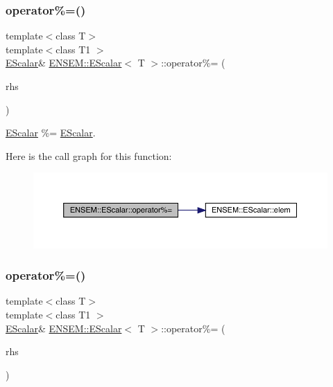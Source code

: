 \subsubsection{\texorpdfstring{operator\%=()}{operator\%=()}\hspace{0.1cm}{\footnotesize\ttfamily [1/3]}}
{\footnotesize\ttfamily template$<$class T$>$ \\
template$<$class T1 $>$ \\
\mbox{\hyperlink{classENSEM_1_1EScalar}{E\+Scalar}}\& \mbox{\hyperlink{classENSEM_1_1EScalar}{E\+N\+S\+E\+M\+::\+E\+Scalar}}$<$ T $>$\+::operator\%= (\begin{DoxyParamCaption}\item[{const \mbox{\hyperlink{classENSEM_1_1EScalar}{E\+Scalar}}$<$ T1 $>$ \&}]{rhs }\end{DoxyParamCaption})\hspace{0.3cm}{\ttfamily [inline]}}



\mbox{\hyperlink{classENSEM_1_1EScalar}{E\+Scalar}} \%= \mbox{\hyperlink{classENSEM_1_1EScalar}{E\+Scalar}}. 

Here is the call graph for this function\+:
\nopagebreak
\begin{figure}[H]
\begin{center}
\leavevmode
\includegraphics[width=350pt]{d0/d82/classENSEM_1_1EScalar_ab4bd572c2f331fadf6914f406bce991f_cgraph}
\end{center}
\end{figure}
\mbox{\label{classENSEM_1_1EScalar_ab4bd572c2f331fadf6914f406bce991f}} 
\subsubsection{\texorpdfstring{operator\%=()}{operator\%=()}\hspace{0.1cm}{\footnotesize\ttfamily [2/3]}}
{\footnotesize\ttfamily template$<$class T$>$ \\
template$<$class T1 $>$ \\
\mbox{\hyperlink{classENSEM_1_1EScalar}{E\+Scalar}}\& \mbox{\hyperlink{classENSEM_1_1EScalar}{E\+N\+S\+E\+M\+::\+E\+Scalar}}$<$ T $>$\+::operator\%= (\begin{DoxyParamCaption}\item[{const \mbox{\hyperlink{classENSEM_1_1EScalar}{E\+Scalar}}$<$ T1 $>$ \&}]{rhs }\end{DoxyParamCaption})\hspace{0.3cm}{\ttfamily [inline]}}



